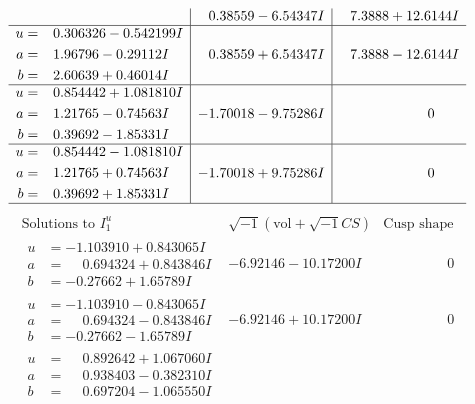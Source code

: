 \documentclass[1p]{elsarticle_modified}
\theoremstyle{definition}
\newcommand{\I}{\sqrt{-1}}
\begin{document}
$$\begin{array}{c|c|c}
 & \phantom{-}0.38559 - 6.54347 I & \phantom{-}7.3888 + 12.6144 I \\ \hline\begin{aligned}
u &= \phantom{-}0.306326 - 0.542199 I \\
a &= \phantom{-}1.96796 - 0.29112 I \\
b &= \phantom{-}2.60639 + 0.46014 I\end{aligned}
 & \phantom{-}0.38559 + 6.54347 I & \phantom{-}7.3888 - 12.6144 I \\ \hline\begin{aligned}
u &= \phantom{-}0.854442 + 1.081810 I \\
a &= \phantom{-}1.21765 - 0.74563 I \\
b &= \phantom{-}0.39692 - 1.85331 I\end{aligned}
 & -1.70018 - 9.75286 I & \phantom{-0.000000 } 0 \\ \hline\begin{aligned}
u &= \phantom{-}0.854442 - 1.081810 I \\
a &= \phantom{-}1.21765 + 0.74563 I \\
b &= \phantom{-}0.39692 + 1.85331 I\end{aligned}
 & -1.70018 + 9.75286 I & \phantom{-0.000000 } 0\\
 \hline 
 \end{array}$$\newpage$$\begin{array}{c|c|c}  
\text{Solutions to }I^u_{1}& \I (\text{vol} + \sqrt{-1}CS) & \text{Cusp shape}\\
 \hline 
\begin{aligned}
u &= -1.103910 + 0.843065 I \\
a &= \phantom{-}0.694324 + 0.843846 I \\
b &= -0.27662 + 1.65789 I\end{aligned}
 & -6.92146 - 10.17200 I & \phantom{-0.000000 } 0 \\ \hline\begin{aligned}
u &= -1.103910 - 0.843065 I \\
a &= \phantom{-}0.694324 - 0.843846 I \\
b &= -0.27662 - 1.65789 I\end{aligned}
 & -6.92146 + 10.17200 I & \phantom{-0.000000 } 0 \\ \hline\begin{aligned}
u &= \phantom{-}0.892642 + 1.067060 I \\
a &= \phantom{-}0.938403 - 0.382310 I \\
b &= \phantom{-}0.697204 - 1.065550 I\end{aligned}

\end{array}$$
\end{document}
